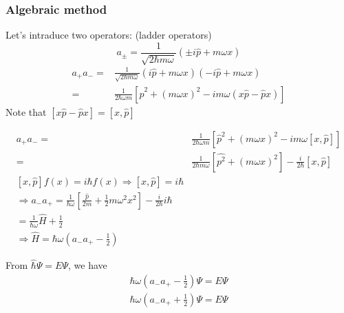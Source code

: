 \documentclass[12pt, a4paper]{article}
\begin{document}
\subsubsection{Algebraic method}
Let's intraduce two operators: (ladder operators)
$$a_{\pm}=\frac{1}{\sqrt{2\hbar m\omega}}(\pm i\hat{p}+m\omega x)$$
\begin{align*}
a_{+}a_{-}=&\frac{1}{\sqrt{2\hbar m \omega}}(i\hat{p} +m\omega x)(-i\hat{p}+m\omega x)\\
=&\frac{1}{2\hbar \omega m}[ \hat{p}^2 +(m\omega x)^2-im\omega (x\hat{p} -\hat{p} x)]
\end{align*}
Note that $[x\hat{p}-\hat{p} x]=[x,\hat{p}]$

\begin{align*}
a_{+}a_{-}=&\frac{1}{2\hbar \omega m}[ \hat{p}^2 +(m\omega x)^2-im\omega [x,\hat{p}]]\\
=&\frac{1}{2\hbar m \omega}[\hat{p^2}+(m\omega x)^2]-\frac{i}{2\hbar}[x,\hat{p}]\\
[x,\hat{p}]f(x)=i\hbar f(x)\Rightarrow [x,\hat{p}]=i\hbar\\
\Rightarrow a_{-}a_+=\frac{1}{\hbar \omega}[\frac{\hat{p}}{2m}+\frac{1}{2}m\omega^2x^2]-\frac{i}{2\hbar}i\hbar\\
=\frac{1}{\hbar\omega}\hat{H}+\frac{1}{2}\\
\Rightarrow \hat{H}=\hbar\omega(a_-a_+-\frac{1}{2})
\end{align*}

From $\hat{\hbar}\Psi=E\Psi$, we have
\begin{align*}
\hbar\omega(a_-a_+-\frac{1}{2})\Psi=E\Psi\\
\hbar\omega(a_-a_++\frac{1}{2})\Psi=E\Psi
\end{align*}
\end{document}

